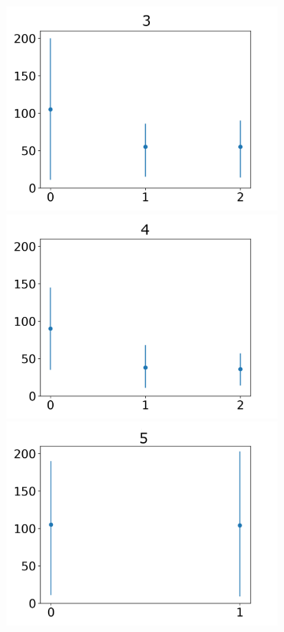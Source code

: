 \documentclass[journal]{IEEEtran}
\begin{document}
{{\begin{figure}[h!]
\begin{subfigure}{0.5\textwidth}
\centering
\includegraphics[scale=0.27]{Images/Average_steps/c.png}
 \includegraphics[scale=0.27]{Images/Average_steps/d.png} 
 \centering
  \includegraphics[scale=0.27]{Images/Average_steps/e.png} 

\end{subfigure}
\end{figure}}}
\end{document}
